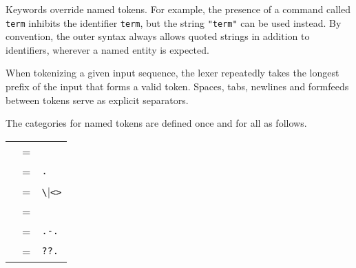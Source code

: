 \begin{isabellebody}
\begin{isamarkuptext}
  Keywords override named tokens.  For example, the presence of a
  command called \verb|term| inhibits the identifier \verb|term|, but the string \verb|"term"| can be used instead.
  By convention, the outer syntax always allows quoted strings in
  addition to identifiers, wherever a named entity is expected.

  When tokenizing a given input sequence, the lexer repeatedly takes
  the longest prefix of the input that forms a valid token.  Spaces,
  tabs, newlines and formfeeds between tokens serve as explicit
  separators.

  \medskip The categories for named tokens are defined once and for
  all as follows.

  \begin{center}
  \begin{supertabular}{rcl}
    \hypertarget{syntax.ident}{\hyperlink{syntax.ident}{\mbox{}}} & = &  \\
    \hypertarget{syntax.longident}{\hyperlink{syntax.longident}{\mbox{}}} & = & \verb|.| \\
    \hypertarget{syntax.symident}{\hyperlink{syntax.symident}{\mbox{}}} & = & \verb|\|\verb|<|\verb|>| \\
    \hypertarget{syntax.nat}{\hyperlink{syntax.nat}{\mbox{}}} & = &  \\
    \hypertarget{syntax.float}{\hyperlink{syntax.float}{\mbox{}}} & = & \hyperlink{syntax.nat}{\mbox{}}\verb|.|\hyperlink{syntax.nat}{\mbox{}}\isa{{\isachardoublequote}\ \ {\isacharbar}\ \ {\isachardoublequote}}\verb|-|\hyperlink{syntax.nat}{\mbox{}}\verb|.|\hyperlink{syntax.nat}{\mbox{}} \\
    \hypertarget{syntax.var}{\hyperlink{syntax.var}{\mbox{}}} & = & \verb|?|\verb|?|\verb|.| \\

\end{supertabular}
\end{center}
\end{isamarkuptext}
\end{isabellebody}
